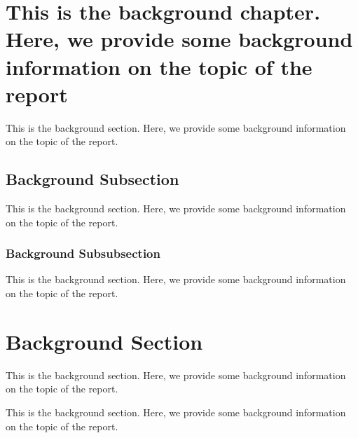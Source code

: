 \documentclass{report}
\begin{document}
\section{This is the background chapter. Here, we provide some background information on the topic of the report}
This is the background section. Here, we provide some background information on
the topic of the report.

\subsection{Background Subsection}
This is the background section. Here, we provide some background information on
the topic of the report.
\subsubsection{Background Subsubsection}
This is the background section. Here, we provide some background information on the topic of the report.

\section{Background Section}
This is the background section. Here, we provide some background information on
the topic of the report.

This is the background section. Here, we provide some background information on
the topic of the report.
\end{document}
